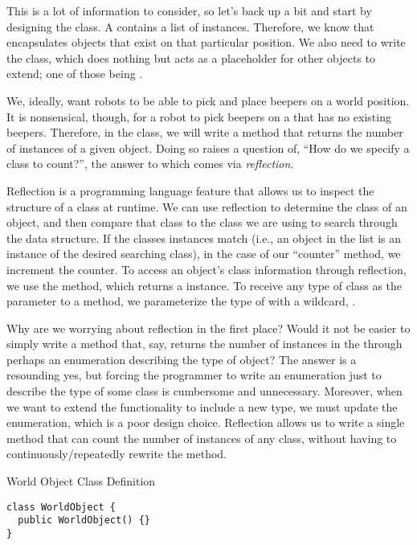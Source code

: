This is a lot of information to consider, so let's back up a bit and start by designing the  class. A  contains a list of  instances. Therefore, we know that  encapsulates objects that exist on that particular position. We also need to write the  class, which does nothing but acts as a placeholder for other objects to extend; one of those being .

We, ideally, want robots to be able to pick and place beepers on a world position. It is nonsensical, though, for a robot to pick beepers on a  that has no existing beepers. Therefore, in the  class, we will write a method that returns the number of instances of a given object. Doing so raises a question of, ``How do we specify a class to count?'', the answer to which comes via \textit{reflection}. 

Reflection is a programming language feature that allows us to inspect the structure of a class at runtime. We can use reflection to determine the class of an object, and then compare that class to the class we are using to search through the data structure. If the classes instances match (i.e., an object in the list is an instance of the desired searching class), in the case of our ``counter'' method, we increment the counter. To access an object's class information through reflection, we use the  method, which returns a  instance. To receive any type of class as the parameter to a method, we parameterize the type of  with a wildcard, .

Why are we worrying about reflection in the first place? Would it not be easier to simply write a method that, say, returns the number of  instances in the  through perhaps an enumeration describing the type of object? The answer is a resounding yes, but forcing the programmer to write an enumeration just to describe the type of some class is cumbersome and unnecessary. Moreover, when we want to extend the functionality to include a new type, we must update the enumeration, which is a poor design choice. Reflection allows us to write a single method that can count the number of instances of any class, without having to continuously/repeatedly rewrite the method.

\begin{cl}{World Object Class Definition}
\begin{lstlisting}[language=MyJava]
class WorldObject {
  public WorldObject() {}
}
\end{lstlisting}
\end{cl}

